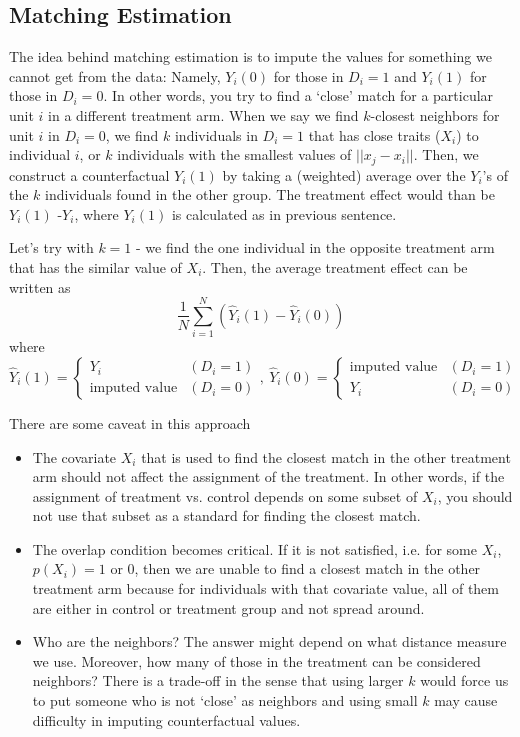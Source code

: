 \documentclass[12pt]{article}
\theoremstyle{definition}
\theoremstyle{property}
\theoremstyle{assumption}
\theoremstyle{example}
\theoremstyle{comment}
\begin{document}
\subsection{Matching Estimation}
The idea behind matching estimation is to impute the values for something we cannot get from the data: Namely,  $Y_i(0)$ for those in $D_i=1$ and $Y_i(1)$ for those in $D_i=0$. In other words, you try to find a `close' match for a particular unit $i$ in a different treatment arm. When we say we find $k$-closest neighbors for unit $i$ in $D_i=0$, we find $k$ individuals in $D_i=1$ that has close traits ($X_i$) to individual $i$, or $k$ individuals with the smallest values of $||x_j - x_i||$. Then, we construct a counterfactual $Y_i(1)$ by taking a (weighted) average over the $Y_i$'s of the $k$ individuals found in the other group. The treatment effect would than be $Y_i(1)$ -$Y_i$, where $Y_i(1)$ is calculated as in previous sentence. \par
Let's try with $k=1$ - we find the one individual in the opposite treatment arm that has the similar value of $X_i$. Then, the average treatment effect can be written as
\[
\frac{1}{N}\sum_{i=1}^N(\hat{Y}_i(1)-\hat{Y}_i(0))
\]
where
\[
\hat{Y}_i(1)=\begin{cases} Y_i & (D_i=1) \\ \text{imputed value} & (D_i=0)\end{cases}, \ \hat{Y}_i(0)=\begin{cases} \text{imputed value} & (D_i=1) \\ Y_i & (D_i=0)\end{cases}
\]
\par
There are some caveat in this approach
\begin{itemize}
\item The covariate $X_i$ that is used to find the closest match in the other treatment arm should not affect the assignment of the treatment. In other words, if the assignment of treatment vs. control depends on some subset of $X_i$, you should not use that subset as a standard for finding the closest match.
\item The overlap condition becomes critical. If it is not satisfied, i.e. for some $X_i$, $p(X_i)=1$ or $0$, then we are unable to find a closest match in the other treatment arm because for individuals with that covariate value, all of them are either in control or treatment group and not spread around. 
\item Who are the neighbors? The answer might depend on what distance measure we use. Moreover, how many of those in the treatment can be considered neighbors? There is a trade-off in the sense that using larger $k$ would force us to put someone who is not `close' as neighbors and using small $k$ may cause difficulty in imputing counterfactual values. 
\end{itemize}
\end{document}
